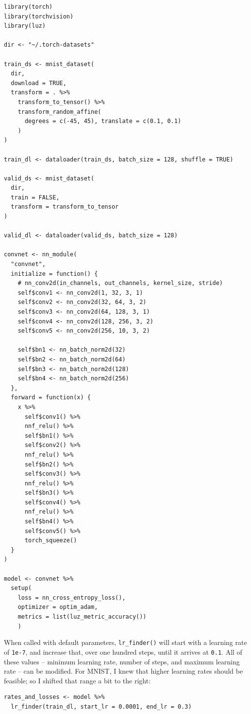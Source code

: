 \documentclass[
  letterpaper,
]{krantz}
\begin{document}
\begin{verbatim}
library(torch)
library(torchvision)
library(luz)

dir <- "~/.torch-datasets" 

train_ds <- mnist_dataset(
  dir,
  download = TRUE,
  transform = . %>%
    transform_to_tensor() %>%
    transform_random_affine(
      degrees = c(-45, 45), translate = c(0.1, 0.1)
    )
)

train_dl <- dataloader(train_ds, batch_size = 128, shuffle = TRUE)

valid_ds <- mnist_dataset(
  dir,
  train = FALSE,
  transform = transform_to_tensor
)

valid_dl <- dataloader(valid_ds, batch_size = 128)

convnet <- nn_module(
  "convnet",
  initialize = function() {
    # nn_conv2d(in_channels, out_channels, kernel_size, stride)
    self$conv1 <- nn_conv2d(1, 32, 3, 1)
    self$conv2 <- nn_conv2d(32, 64, 3, 2)
    self$conv3 <- nn_conv2d(64, 128, 3, 1)
    self$conv4 <- nn_conv2d(128, 256, 3, 2)
    self$conv5 <- nn_conv2d(256, 10, 3, 2)

    self$bn1 <- nn_batch_norm2d(32)
    self$bn2 <- nn_batch_norm2d(64)
    self$bn3 <- nn_batch_norm2d(128)
    self$bn4 <- nn_batch_norm2d(256)
  },
  forward = function(x) {
    x %>%
      self$conv1() %>%
      nnf_relu() %>%
      self$bn1() %>%
      self$conv2() %>%
      nnf_relu() %>%
      self$bn2() %>%
      self$conv3() %>%
      nnf_relu() %>%
      self$bn3() %>%
      self$conv4() %>%
      nnf_relu() %>%
      self$bn4() %>%
      self$conv5() %>%
      torch_squeeze()
  }
)

model <- convnet %>%
  setup(
    loss = nn_cross_entropy_loss(),
    optimizer = optim_adam,
    metrics = list(luz_metric_accuracy())
    )
\end{verbatim}

When called with default parameters, \texttt{lr\_finder()} will start
with a learning rate of \texttt{1e-7}, and increase that, over one
hundred steps, until it arrives at \texttt{0.1}. All of these values --
minimum learning rate, number of steps, and maximum learning rate -- can
be modified. For MNIST, I knew that higher learning rates should be
feasible; so I shifted that range a bit to the right:

\begin{verbatim}
rates_and_losses <- model %>%
  lr_finder(train_dl, start_lr = 0.0001, end_lr = 0.3)
\end{verbatim}
\end{document}
